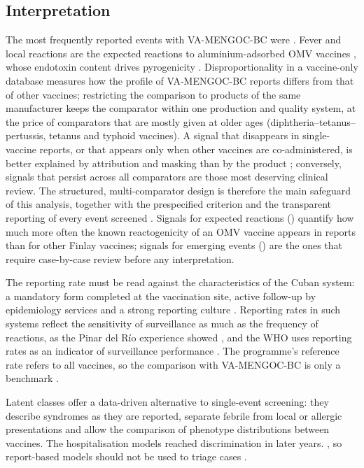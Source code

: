 \documentclass[11pt]{article}
\begin{document}
\subsection{Interpretation}\label{sec:d-interpretation}
The most frequently reported events with VA-MENGOC-BC were \POTopEvents. Fever and local
reactions are the expected reactions to aluminium-adsorbed OMV vaccines \cite{Nokleby2007,Holst2009},
whose endotoxin content drives pyrogenicity \cite{Sheerin2019,Rosenqvist1998}. Disproportionality in a
vaccine-only database measures how the profile of VA-MENGOC-BC reports differs from that of other
vaccines; restricting the comparison to products of the same manufacturer keeps the comparator
within one production and quality system, at the price of comparators that are mostly given at
older ages (diphtheria--tetanus--pertussis, tetanus and typhoid vaccines). A signal that disappears
in single-vaccine reports, or that appears only when other vaccines are co-administered, is better
explained by attribution and masking than by the product \cite{Maignen2014,Salvo2013}; conversely,
signals that persist across all comparators are those most deserving clinical review. The structured, multi-comparator design is therefore the
main safeguard of this analysis, together with the prespecified criterion and the transparent
reporting of every event screened \cite{Fusaroli2024Elaboration,Fusaroli2026Pitfalls}.
Signals for expected reactions (\POSignalExpectedList) quantify how much more often the known
reactogenicity of an OMV vaccine appears in reports than for other Finlay vaccines; signals for emerging
events (\POSignalEmergingList) are the ones that require case-by-case review before any
interpretation.

The reporting rate must be read against the characteristics of the Cuban system: a mandatory form
completed at the vaccination site, active follow-up by epidemiology services and a strong
reporting culture \cite{Galindo2012,Reed2007}. Reporting rates in such systems reflect the
sensitivity of surveillance as much as the frequency of reactions, as the Pinar del Río experience
showed \cite{CruzRodriguez2021}, and
the WHO uses reporting rates as an indicator of surveillance performance \cite{Lei2018}. The
programme's reference rate refers to all vaccines, so the comparison with VA-MENGOC-BC is only a
benchmark \cite{Mahaux2016}.

Latent classes offer a data-driven alternative to single-event screening: they describe
syndromes as they are reported, separate febrile from local or allergic presentations and allow
the comparison of phenotype distributions between vaccines. The hospitalisation models reached
\PODiscriminationWord{} discrimination in later years. \POHospInterpretation, so report-based models
should not be used to triage cases \cite{VanCalster2019,Collins2024}.
\end{document}
